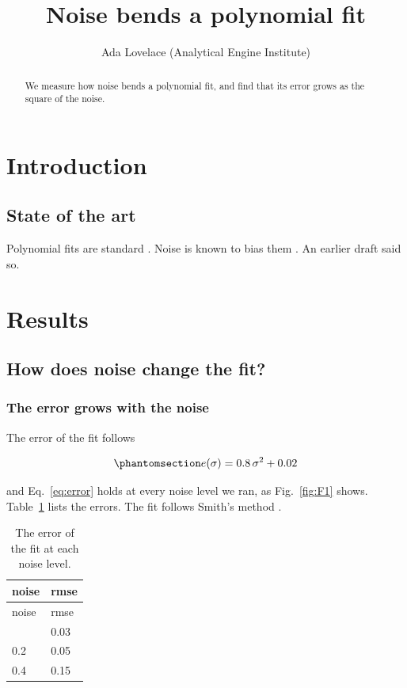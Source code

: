 \documentclass[
]{testconf}
\title{Noise bends a polynomial fit}
\author{Ada Lovelace (Analytical Engine Institute)}
\date{}
\begin{document}
\maketitle
\begin{abstract}
We measure how noise bends a polynomial fit, and find that its error
grows as the square of the noise.
\end{abstract}

\section{Introduction}\label{introduction}

\subsection{State of the art}\label{introduction-state-of-the-art}

Polynomial fits are standard \citep{smith-2020-fits, jones-2019-least}.
Noise is known to bias them \citep{lee-2018-noise}. An earlier draft
said so.

\section{Results}\label{results}

\subsection{How does noise change the fit?}\label{O1}

\subsubsection{The error grows with the noise}\label{R1}

The error of the fit follows

\begin{equation}\protect\phantomsection\label{eq:error}{ e(\sigma) = 0.8\,\sigma^2 + 0.02 }\end{equation}

and Eq.~\ref{eq:error} holds at every noise level we ran, as
Fig.~\ref{fig:F1} shows. Table~\ref{tbl:T1} lists the errors. The fit
follows Smith's method \citep{smith-2020-fits}.

\begin{longtable}[]{@{}ll@{}}
\caption{The error of the fit at each noise
level.}\label{tbl:T1}\tabularnewline
\toprule\noalign{}
noise & rmse \\
\midrule\noalign{}
\endfirsthead
\toprule\noalign{}
noise & rmse \\
\midrule\noalign{}
\endhead
\bottomrule\noalign{}
\endlastfoot
0.1 & 0.03 \\
0.2 & 0.05 \\
0.4 & 0.15 \\
\end{longtable}
\end{document}
